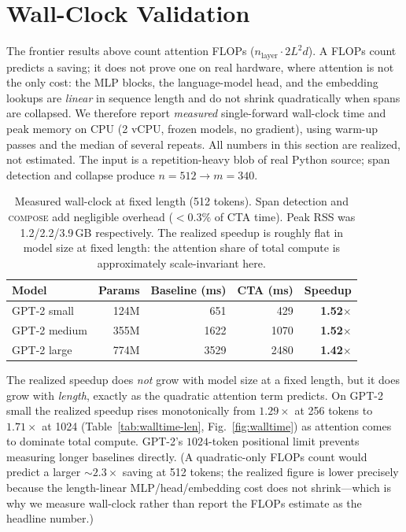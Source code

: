\documentclass[11pt]{article}
\newcommand{\compose}{\textsc{compose}}
\begin{document}
\section{Wall-Clock Validation}
\label{sec:walltime}

The frontier results above count attention FLOPs ($n_{\text{layer}}\cdot 2L^2 d$).
A FLOPs count predicts a saving; it does not prove one on real hardware, where attention
is not the only cost: the MLP blocks, the language-model head, and the embedding lookups
are \emph{linear} in sequence length and do not shrink quadratically when spans are
collapsed. We therefore report \emph{measured} single-forward wall-clock time and peak
memory on CPU (2 vCPU, frozen models, no gradient), using warm-up passes and the median of
several repeats. All numbers in this section are realized, not estimated. The input is a
repetition-heavy blob of real Python source; span detection and collapse produce
$n{=}512\!\to\!m{=}340$.

\begin{table}[h]
\centering
\small
\begin{tabular}{lrrrr}
\toprule
Model & Params & Baseline (ms) & CTA (ms) & \textbf{Speedup} \\
\midrule
GPT-2 small  & 124M & 651  & 429  & \textbf{1.52$\times$} \\
GPT-2 medium & 355M & 1622 & 1070 & \textbf{1.52$\times$} \\
GPT-2 large  & 774M & 3529 & 2480 & \textbf{1.42$\times$} \\
\bottomrule
\end{tabular}
\caption{Measured wall-clock at fixed length (512 tokens). Span detection and \compose{}
add negligible overhead ($<0.3\%$ of CTA time). Peak RSS was 1.2/2.2/3.9\,GB respectively.
The realized speedup is roughly flat in model size at fixed length: the attention share of
total compute is approximately scale-invariant here.}
\label{tab:walltime-models}
\end{table}

The realized speedup does \emph{not} grow with model size at a fixed length, but it does
grow with \emph{length}, exactly as the quadratic attention term predicts. On GPT-2 small
the realized speedup rises monotonically from $1.29\times$ at 256 tokens to $1.71\times$ at
1024 (Table~\ref{tab:walltime-len}, Fig.~\ref{fig:walltime}) as attention comes to
dominate total compute. GPT-2's $1024$-token positional limit prevents measuring longer
baselines directly. (A quadratic-only FLOPs count would predict a larger ${\sim}2.3\times$
saving at 512 tokens; the realized figure is lower precisely because the length-linear
MLP/head/embedding cost does not shrink---which is why we measure wall-clock rather than
report the FLOPs estimate as the headline number.)
\end{document}
